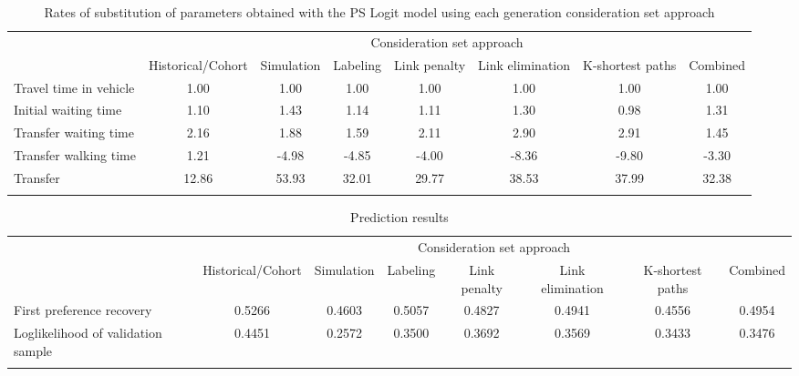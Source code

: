 \documentclass[12pt,a4paper]{article}
\begin{document}
\begin{landscape}
\begin{table}[]
\centering
\footnotesize\setlength\tabcolsep{3 pt}
\caption{Rates of substitution of parameters obtained with the PS Logit model using each generation consideration set approach}
\label{tab:ratessub}  
\begin{tabular}{lccccccc}
\hline\noalign{\smallskip}
\multirow{2}{*}{Parameters} & \multicolumn{7}{c}{Consideration set approach}                                                            \\
                            & Historical/Cohort & Simulation & Labeling & Link penalty & Link elimination & K-shortest paths & Combined \\
\noalign{\smallskip}\hline\noalign{\smallskip}
Travel time in vehicle      & 1.00              & 1.00       & 1.00     & 1.00         & 1.00             & 1.00             & 1.00     \\
Initial waiting time        & 1.10              & 1.43       & 1.14     & 1.11         & 1.30             & 0.98             & 1.31     \\
Transfer waiting time       & 2.16              & 1.88       & 1.59     & 2.11         & 2.90             & 2.91             & 1.45     \\
Transfer walking time       & 1.21              & -4.98      & -4.85    & -4.00        & -8.36            & -9.80            & -3.30    \\
Transfer                    & 12.86             & 53.93      & 32.01    & 29.77        & 38.53            & 37.99            & 32.38   \\
\noalign{\smallskip}\hline
\end{tabular}
\end{table}

\begin{table}[]
\centering
\footnotesize\setlength\tabcolsep{3 pt}
\caption{Prediction results}
\label{tab:prediction} 
\begin{tabular}{lccccccc}
\hline\noalign{\smallskip}
\multicolumn{1}{c}{\multirow{2}{*}{Indicator}} & \multicolumn{7}{c}{Consideration set approach}                                                            \\
\multicolumn{1}{c}{}                            & Historical/Cohort & Simulation & Labeling & Link penalty & Link elimination & K-shortest paths & Combined \\
\noalign{\smallskip}\hline\noalign{\smallskip}
First preference recovery                       & 0.5266            & 0.4603     & 0.5057   & 0.4827       & 0.4941           & 0.4556           & 0.4954   \\
Loglikelihood of validation sample              & 0.4451            & 0.2572     & 0.3500   & 0.3692       & 0.3569           & 0.3433           & 0.3476  \\
\noalign{\smallskip}\hline
\end{tabular}
\end{table}

\end{landscape}
\end{document}
